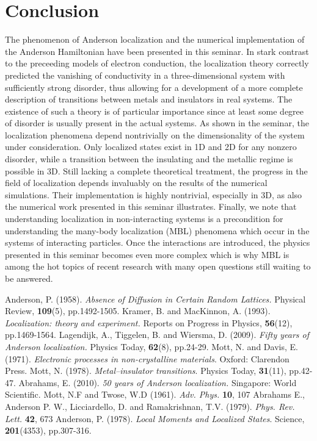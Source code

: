 \documentclass[10pt,a4paper]{article}
\begin{document}
\section{Conclusion}
The phenomenon of Anderson localization and the numerical implementation of the Anderson Hamiltonian have been presented in this seminar. In stark contrast to the preceeding models of electron conduction, the localization theory correctly predicted the vanishing of conductivity in a three-dimensional system with sufficiently strong disorder, thus allowing for a development of a more complete description of transitions between metals and insulators in real systems. The existence of such a theory is of particular importance since at least some degree of disorder is usually present in the actual systems. As shown in the seminar, the localization phenomena depend nontrivially on the dimensionality of the system under consideration. Only localized states exist in 1D and 2D for any nonzero disorder, while a transition between the insulating and the metallic regime is possible in 3D. Still lacking a complete theoretical treatment, the progress in the field of localization depends invaluably on the results of the numerical simulations. Their implementation is highly nontrivial, especially in 3D, as also the numerical work presented in this seminar illustrates. Finally, we note that understanding localization in non-interacting systems is a precondition for understanding the many-body localization (MBL) phenomena which occur in the systems of interacting particles. Once the interactions are introduced, the physics presented in this seminar becomes even more complex which is why MBL is among the hot topics of recent research with many open questions still waiting to be answered. 
\begin{thebibliography}{99}
Anderson, P. (1958). \emph{Absence of Diffusion in Certain Random Lattices.} Physical Review, \textbf{109}(5), pp.1492-1505.
Kramer, B. and MacKinnon, A. (1993). \emph{Localization: theory and experiment.} Reports on Progress in Physics, \textbf{56}(12), pp.1469-1564.
Lagendijk, A., Tiggelen, B. and Wiersma, D. (2009). \emph{Fifty years of Anderson localization.} Physics Today, \textbf{62}(8), pp.24-29.
Mott, N. and Davis, E. (1971). \emph{Electronic processes in non-crystalline materials}. Oxford: Clarendon Press.
Mott, N. (1978). \emph{Metal–insulator transitions}. Physics Today, \textbf{31}(11), pp.42-47.
Abrahams, E. (2010). \emph{50 years of Anderson localization.} Singapore: World Scientific.
Mott, N.F and Twose, W.D (1961). \emph{Adv. Phys.} \textbf{10}, 107
Abrahams E., Anderson P. W., Licciardello, D. and Ramakrishnan, T.V. (1979). \emph{Phys. Rev. Lett.} \textbf{42}, 673
Anderson, P. (1978). \emph{Local Moments and Localized States}. Science, \textbf{201}(4353), pp.307-316.
\end{thebibliography}
\end{document}
